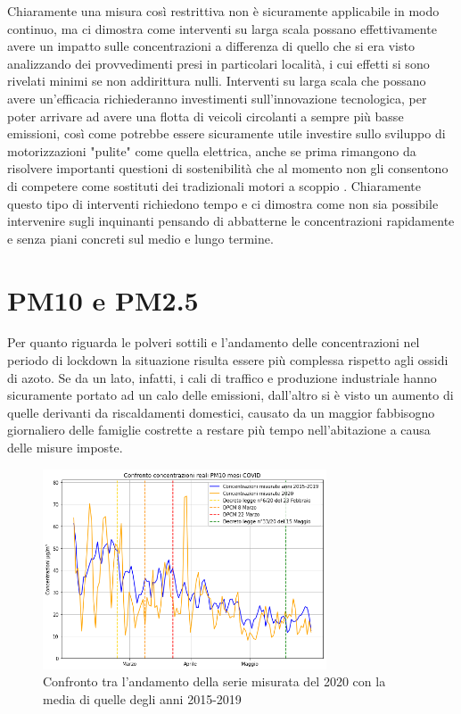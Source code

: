 \documentclass[a4paper]{report}
\begin{document}
Chiaramente una misura così restrittiva non è sicuramente applicabile in modo continuo, ma ci dimostra come interventi su larga scala possano effettivamente avere un
 impatto sulle concentrazioni a differenza di quello che si era visto analizzando dei provvedimenti presi in particolari località, i cui effetti si sono rivelati minimi se non addirittura nulli.
Interventi su larga scala che possano avere un'efficacia richiederanno investimenti sull'innovazione tecnologica, per poter arrivare ad avere una flotta di veicoli circolanti a sempre più basse emissioni, così come potrebbe essere sicuramente utile investire sullo sviluppo di motorizzazioni "pulite" come quella elettrica, anche se prima rimangono da risolvere importanti questioni di sostenibilità che al momento non gli consentono di competere come sostituti dei tradizionali motori a scoppio \cite{skonhoft2014norwegian, jones2019if}.
Chiaramente questo tipo di interventi richiedono tempo
 e ci dimostra come non sia possibile intervenire sugli inquinanti pensando di abbatterne le concentrazioni rapidamente e senza piani concreti sul medio e lungo termine.

\section{PM10 e PM2.5}
Per quanto riguarda le polveri sottili e l'andamento delle concentrazioni nel periodo di lockdown la situazione risulta essere più complessa rispetto agli ossidi di azoto.
Se da un lato, infatti, i cali di traffico e produzione industriale hanno sicuramente portato ad un calo delle emissioni, dall'altro si è visto un aumento di quelle derivanti da riscaldamenti domestici, causato da un maggior fabbisogno giornaliero delle famiglie costrette a restare più tempo nell'abitazione a causa delle misure imposte. 

\begin{figure}[h]
\centering
\includegraphics[width=0.75\textwidth]{pm10_covid}
\caption{Confronto tra l'andamento della serie misurata del 2020 con la media di quelle degli anni 2015-2019}
\label{fig:pm10_covid}
\end{figure}
\end{document}
